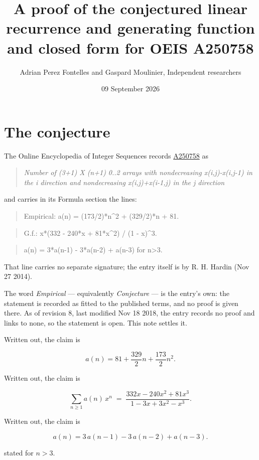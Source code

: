 \documentclass[11pt]{article}
\title{A proof of the conjectured linear recurrence and generating function and closed form for OEIS A250758}
\author{Adrian Perez Fontelles and Gaspard Moulinier, Independent researchers}
\date{09 September 2026}
\theoremstyle{definition}
\begin{document}
\maketitle
\section{The conjecture}

The Online Encyclopedia of Integer Sequences records \href{https://oeis.org/A250758}{A250758} as

\begin{quote}\itshape Number of (3+1) X (n+1) 0..2 arrays with nondecreasing x(i,j)-x(i,j-1) in the i direction and nondecreasing x(i,j)+x(i-1,j) in the j direction\end{quote}

and carries in its Formula section the lines:

\begin{quote}\ttfamily Empirical: a(n) = (173/2)*n\textasciicircum{}2 + (329/2)*n + 81.\end{quote}

\begin{quote}\ttfamily G.f.: x*(332 - 240*x + 81*x\textasciicircum{}2) / (1 - x)\textasciicircum{}3.\end{quote}

\begin{quote}\ttfamily a(n) = 3*a(n-1) - 3*a(n-2) + a(n-3) for n>3.\end{quote}

That line carries no separate signature; the entry itself is by R. H. Hardin (Nov 27 2014).

The word {\itshape Empirical} --- equivalently {\itshape Conjecture} --- is the entry's own: the statement is recorded as fitted to the published terms, and no proof is given there. As of revision 8, last modified Nov 18 2018, the entry records no proof and links to none, so the statement is open. This note settles it.

Written out, the claim is

\[a(n) = 81 + \frac{329}{2}n + \frac{173}{2}n^{2}.\]

Written out, the claim is

\[\sum_{n \ge 1} a(n)\,x^n \;=\; \frac{332x - 240x^{2} + 81x^{3}}{1 - 3x + 3x^{2} - x^{3}}.\]

Written out, the claim is

\[a(n) = 3\,a(n-1) - 3\,a(n-2) + a(n-3).\]

stated for $n > 3$.
\end{document}
